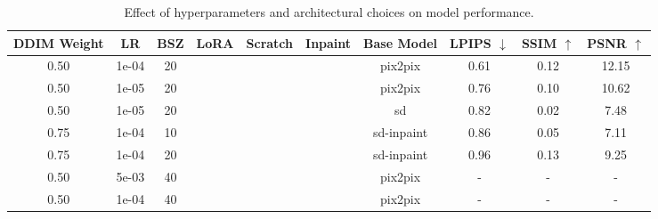 \documentclass[11pt,twocolumn]{article}
\newcommand{\cmark}{\checkmark}
\newcommand{\xmark}{\ding{55}}
\begin{document}
\begin{table}[t]
  \begin{subtable}[t]{\textwidth}
    \centering
    \vspace{0pt}
    \begin{tabular}{ccccccc|ccc}
    \toprule
    \textbf{DDIM Weight} & \textbf{LR} & \textbf{BSZ} & \textbf{LoRA} & \textbf{Scratch} & \textbf{Inpaint} & \textbf{Base Model} & \textbf{LPIPS} $\downarrow$ & \textbf{SSIM} $\uparrow$ & \textbf{PSNR} $\uparrow$ \\
    \midrule
    0.50 & 1e-04 & 20 & \cmark & \xmark & \xmark & pix2pix & 0.61 & 0.12 & 12.15 \\
    0.50 & 1e-05 & 20 & \cmark & \xmark & \xmark & pix2pix & 0.76 & 0.10 & 10.62 \\
    0.50 & 1e-05 & 20 & \xmark & \cmark & \xmark & sd & 0.82 & 0.02 & 7.48 \\
    0.75 & 1e-04 & 10 & \xmark & \xmark & \cmark & sd-inpaint & 0.86 & 0.05 & 7.11 \\
    0.75 & 1e-04 & 20 & \cmark & \xmark & \cmark & sd-inpaint & 0.96 & 0.13 & 9.25 \\
    0.50 & 5e-03 & 40 & \cmark & \xmark & \xmark & pix2pix & - & - & - \\
    0.50 & 1e-04 & 40 & \cmark & \xmark & \xmark & pix2pix & - & - & - \\
    \bottomrule
    \end{tabular}
    \label{tab:arch-ablation}
  \end{subtable}

  \caption{Effect of hyperparameters and architectural choices on model performance.}
  \label{tab:combined-hparams-arch}
\end{table}




\newpage


\end{document}
